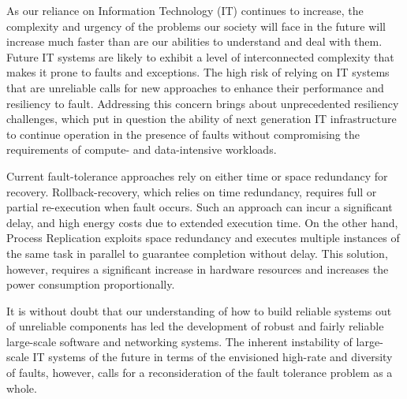 \leading{13pt}

As our reliance on Information Technology (IT) continues to increase, the complexity and urgency of the problems our society will face in the future will increase much faster than are our abilities to understand and deal with them. Future IT systems are likely to exhibit a level of interconnected complexity that makes it prone to faults and exceptions. The high risk of relying on IT systems that are unreliable calls for new approaches to enhance their performance and resiliency to fault. Addressing this concern brings about unprecedented resiliency challenges, which put in question the ability of next generation IT infrastructure to continue operation in the presence of faults without compromising the requirements of compute- and data-intensive workloads. 

Current fault-tolerance approaches rely on either time or space redundancy for recovery. Rollback-recovery, which
relies on time redundancy, requires full or partial re-execution when fault occurs. 
Such an approach
can incur a significant delay, %
and high energy costs due to extended execution time.
On the other hand, Process Replication exploits space redundancy and executes multiple
instances of the same task in parallel to guarantee completion without delay.  %
This solution,
however, requires a significant increase in hardware resources and increases the power consumption proportionally. 

It is without doubt that our understanding of how to build reliable systems out of unreliable components has led the development of robust and fairly reliable large-scale software and networking systems. The inherent instability of large-scale IT systems of the future in terms of the envisioned high-rate and diversity of faults, however, calls for a reconsideration of the fault tolerance problem as a whole. %

